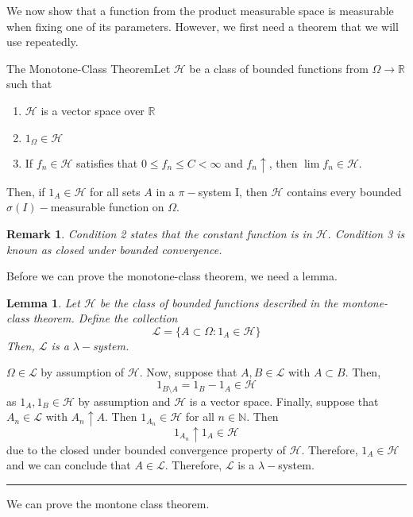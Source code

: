 \documentclass[twoside]{article}
\newtheorem{lemma}[theorem]{Lemma}
\newtheorem{remark}[theorem]{Remark}
\newenvironment{proof}{{\bf Proof:}}{\hfill\rule{2mm}{2mm}}
\begin{document}
We now show that a function from the product measurable space is measurable when fixing one of its parameters. However, we first need a theorem that we will use repeatedly.


\begin{theorem_exam}{The Monotone-Class Theorem}{}Let $\mathcal{H}$ be a class of bounded functions from $\Omega \rightarrow \mathbb{R}$ such that 
\begin{enumerate}
\item $\mathcal{H}$ is a vector space over $\mathbb{R}$
\item $1_{\Omega} \in \mathcal{H}$
\item If $f_n \in \mathcal{H}$ satisfies that $0 \leq f_n \leq C < \infty$ and $f_n \uparrow$, then $\lim f_n \in \mathcal{H}$.
\end{enumerate}
Then, if $1_{A} \in \mathcal{H}$ for all sets $A$ in a $\pi-$system I, then $\mathcal{H}$ contains every bounded $\sigma(I)-$measurable function on $\Omega.$ 
\end{theorem_exam}

\begin{remark} Condition 2 states that the constant function is in $\mathcal{H}.$ Condition 3 is known as closed under bounded convergence.
\end{remark}

Before we can prove the monotone-class theorem, we need a lemma.
\begin{lemma} Let $\mathcal{H}$ be the class of bounded functions described in the montone-class theorem. Define the collection 
$$
\mathcal{L} = \{A \subset \Omega: 1_A \in \mathcal{H}\}
$$
Then, $\mathcal{L}$ is a $\lambda-$system.
\end{lemma}
\begin{proof} $\Omega \in \mathcal{L}$ by assumption of $\mathcal{H}.$ Now, suppose that $A, B \in \mathcal{L}$ with $A \subset B.$ Then, 
$$
1_{B \setminus A} = 1_B - 1_A \in \mathcal{H}
$$
as $1_A, 1_B \in \mathcal{H}$ by assumption and $\mathcal{H}$ is a vector space. Finally, suppose that $A_n \in \mathcal{L}$ with $A_n \uparrow A.$ Then $1_{A_{n}} \in \mathcal{H}$ for all $n \in \mathbb{N}$. Then 
$$
1_{A_{n}} \uparrow 1_A \in \mathcal{H}
$$
due to the closed under bounded convergence property of $\mathcal{H}.$ Therefore, $1_A \in \mathcal{H}$ and we can conclude that $A \in \mathcal{L}.$ Therefore, $\mathcal{L}$ is a $\lambda-$system.
\end{proof}

We can prove the montone class theorem.
\end{document}
